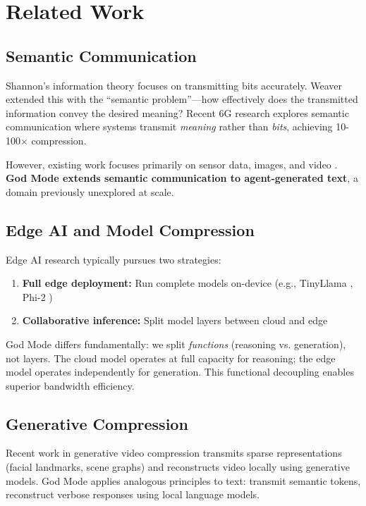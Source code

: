\documentclass{article}
\begin{document}
\section{Related Work}

\subsection{Semantic Communication}

Shannon's information theory \cite{shannon1948} focuses on transmitting bits accurately. Weaver \cite{weaver1949} extended this with the ``semantic problem''---how effectively does the transmitted information convey the desired meaning? Recent 6G research \cite{qin2022,xie2023,itur2023framework} explores semantic communication where systems transmit \textit{meaning} rather than \textit{bits}, achieving 10-100× compression.

However, existing work focuses primarily on sensor data, images, and video \cite{bao2023,jankowski2024}. \textbf{God Mode extends semantic communication to agent-generated text}, a domain previously unexplored at scale.

\subsection{Edge AI and Model Compression}

Edge AI research typically pursues two strategies:
\begin{enumerate}
    \item \textbf{Full edge deployment:} Run complete models on-device (e.g., TinyLlama \cite{zhang2024tinyllama}, Phi-2 \cite{microsoft2023phi2})
    \item \textbf{Collaborative inference:} Split model layers between cloud and edge \cite{kang2017,eshratifar2019}
\end{enumerate}

God Mode differs fundamentally: we split \textit{functions} (reasoning vs. generation), not layers. The cloud model operates at full capacity for reasoning; the edge model operates independently for generation. This functional decoupling enables superior bandwidth efficiency.

\subsection{Generative Compression}

Recent work in generative video compression \cite{lombardo2023,yang2024neural} transmits sparse representations (facial landmarks, scene graphs) and reconstructs video locally using generative models. God Mode applies analogous principles to text: transmit semantic tokens, reconstruct verbose responses using local language models.
\end{document}
